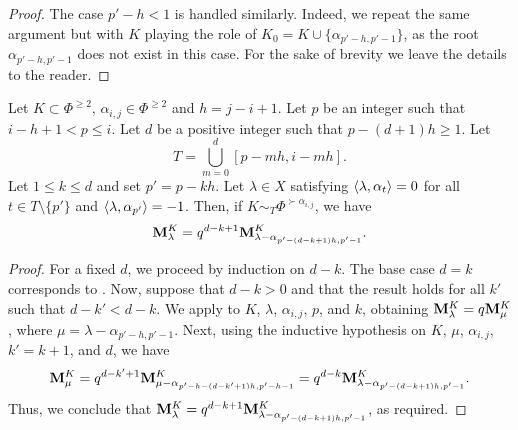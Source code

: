 \begin{proof}
The case $p'-h<1$ is handled similarly.
Indeed, we repeat the same argument but with $K$ playing the role of  $K_0=K\cup \{  \alpha_{p'-h,p'-1}   \}  $, as the root $\alpha_{p'-h,p'-1} $ does not exist in this case. For the sake of brevity we leave the details to the reader. 
\end{proof}

\begin{lemma}\rm\label{Claim: free P}
Let $K \subset \Phi^{\geq 2}$, $\alpha_{i,j} \in \Phi^{\geq 2}$ and $h = j - i + 1$. Let $p$ be an integer such that $i -h+1 < p \leq i$. Let $d$ be a positive integer such that $p-(d+1)h\geq 1$. Let 
    \begin{equation}
        T=\bigcup_{m=0}^{d}[p-mh,i-mh].
    \end{equation}
    Let $1\leq k \leq d$ and set $p'= p-kh$. 
    Let $\lambda\in X$ satisfying $\langle \lambda , \alpha_{t} \rangle=0$ for all $t\in T\setminus\{p'\}$ and $\langle \lambda , \alpha_{p'} \rangle=-1$. Then, if $K \sim_{T} \Phi^{\succ \alpha_{i,j}}$, we have
    \begin{equation}
        \mathbf{M}_{\lambda}^{K} = q^{d-k+1}\mathbf{M}_{\lambda - \alpha_{p'-(d-k+1)h,p'-1}}^{K}.
    \end{equation}
\end{lemma}

\begin{proof}
    For a fixed $d$, we proceed by induction on $d - k$.  
The base case $d = k$ corresponds to . Now, suppose that $d - k > 0$ and that the result holds for all $k'$ such that $d - k' < d - k$.  
We apply  to $K$, $\lambda$, $\alpha_{i,j}$, $p$, and $k$, obtaining $\mathbf{M}_{\lambda}^{K} = q\mathbf{M}_{\mu}^{K}$, where $\mu = \lambda - \alpha_{p' - h, p' - 1}$.  
Next, using the inductive hypothesis on $K$, $\mu$, $\alpha_{i,j}$, $k' = k + 1$, and $d$, we have  
\begin{equation}
    \mathbf{M}_{\mu}^{K} = q^{d - k' + 1} \mathbf{M}_{\mu - \alpha_{p' - h - (d - k' + 1)h, p' - h - 1}}^{K} = q^{d - k} \mathbf{M}_{\lambda - \alpha_{p' - (d - k + 1)h, p' - 1}}^{K}.
\end{equation}  
Thus, we conclude that $\mathbf{M}_{\lambda}^{K} = q^{d - k + 1} \mathbf{M}_{\lambda - \alpha_{p' - (d - k + 1)h, p' - 1}}^{K}$, as required.
    
\end{proof}

